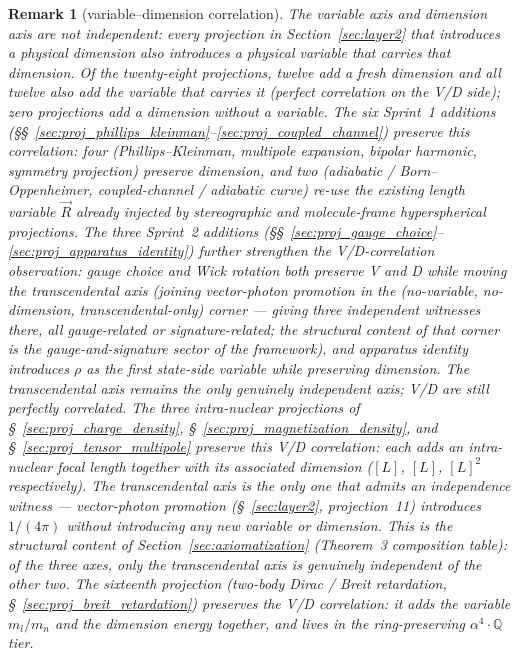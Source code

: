 \documentclass[11pt]{article}
\newtheorem{remark}{Remark}
\begin{document}
\begin{remark}[variable--dimension correlation]
\label{rem:vd_correlation}
The variable axis and dimension axis are not independent: every
projection in Section~\ref{sec:layer2} that introduces a physical
dimension also introduces a physical variable that carries that
dimension.  Of the twenty-eight projections, twelve add a fresh dimension and
all twelve also add the variable that carries it (perfect correlation
on the V/D side); zero projections add a dimension without a
variable.  The six Sprint~1 additions
(\S\S~\ref{sec:proj_phillips_kleinman}--\ref{sec:proj_coupled_channel})
preserve this correlation: four (Phillips--Kleinman, multipole
expansion, bipolar harmonic, symmetry projection) preserve dimension,
and two (adiabatic / Born--Oppenheimer, coupled-channel / adiabatic
curve) re-use the existing length variable $\vec{R}$ already injected
by stereographic and molecule-frame hyperspherical projections.
The three Sprint~2 additions
(\S\S~\ref{sec:proj_gauge_choice}--\ref{sec:proj_apparatus_identity})
further strengthen the V/D-correlation observation: gauge choice and
Wick rotation both preserve V and D while moving the transcendental
axis (joining vector-photon promotion in the (no-variable,
no-dimension, transcendental-only) corner --- giving \emph{three}
independent witnesses there, all gauge-related or signature-related;
the structural content of that corner is the gauge-and-signature
sector of the framework), and apparatus identity introduces $\rho$ as
the first state-side variable while preserving dimension.  The
transcendental axis remains the only genuinely independent axis; V/D
are still perfectly correlated.  The three intra-nuclear projections of
\S~\ref{sec:proj_charge_density}, \S~\ref{sec:proj_magnetization_density},
and \S~\ref{sec:proj_tensor_multipole} preserve this V/D
correlation: each adds an intra-nuclear focal length together with
its associated dimension ($[L]$, $[L]$, $[L]^2$ respectively).  The transcendental axis is the only one that admits an
independence witness --- vector-photon promotion (\S~\ref{sec:layer2},
projection~11) introduces $1/(4\pi)$ without introducing any new
variable or dimension.  This is the structural content of
Section~\ref{sec:axiomatization} (Theorem~3 composition table):
of the three axes, only the transcendental axis is genuinely
independent of the other two.  The sixteenth projection
(two-body Dirac / Breit retardation,
\S~\ref{sec:proj_breit_retardation}) preserves the V/D correlation:
it adds the variable $m_l/m_n$ and the dimension energy together,
and lives in the ring-preserving $\alpha^4 \cdot \mathbb{Q}$ tier.
\end{remark}
\end{document}
